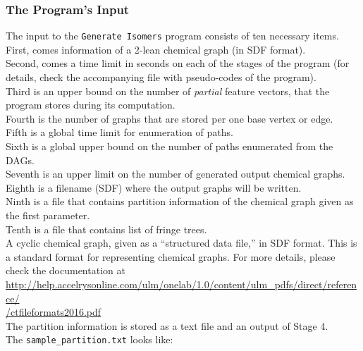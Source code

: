 \documentclass[11pt,titlepage,dvipdfmx,twoside]{article}
\begin{document}
\subsubsection{The Program's Input}
\label{sec:Input_m}


The input to the {\tt Generate Isomers} program
consists of ten necessary items. \\
First, comes information of a 2-lean chemical graph (in SDF format).\\
Second, comes a time limit in seconds on each of the stages of the program 
(for details, check the accompanying file with pseudo-codes of the program).\\
Third is an upper bound on the number of {\em partial} feature vectors, that the program stores
during its computation. \\
Fourth is the number of graphs that are stored per one base vertex or edge.\\
Fifth is a global time limit for enumeration of paths.\\
Sixth is a global upper bound on the number of paths enumerated from the DAGs.\\
Seventh is an upper limit on the number of generated output chemical graphs. \\
Eighth is a filename (SDF) where the output graphs will 
be written.\\
Ninth is a file that contains partition information of
the chemical graph given as the first parameter.\\
Tenth is a file that contains list of fringe trees. 
%
\bigskip\\
A cyclic chemical graph, given as a ``structured data file,'' in  SDF format.
This is a standard format for representing chemical graphs.
For more details, please check the documentation at \\
\url{ http://help.accelrysonline.com/ulm/onelab/1.0/content/ulm_pdfs/direct/reference/} \\
\url{/ctfileformats2016.pdf} 
\bigskip\\
The partition information is stored as a text file and an output of Stage 4. \\
The {\tt sample\_partition.txt} 
looks like: 
\end{document}
